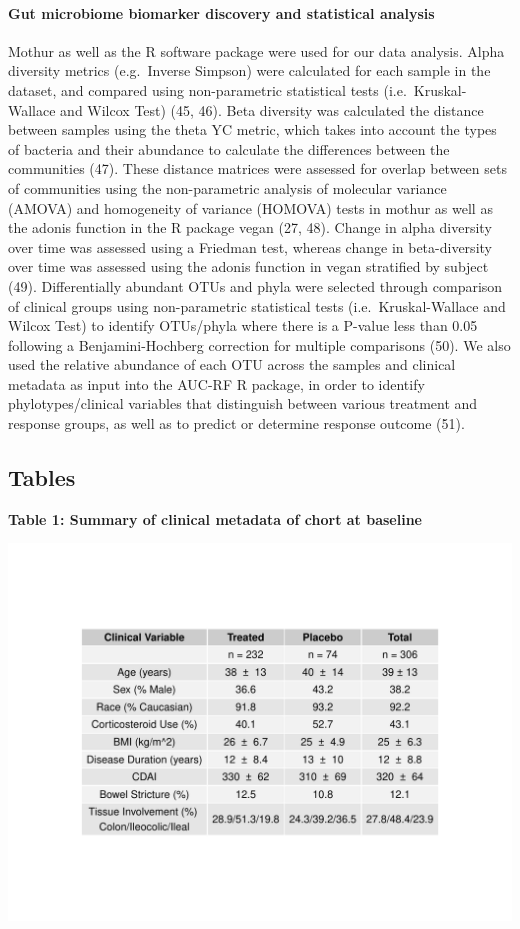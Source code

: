 \documentclass[11pt,]{article}
\let\oldparagraph\paragraph
\renewcommand{\paragraph}[1]{\oldparagraph{#1}\mbox{}}
\begin{document}
\paragraph{Gut microbiome biomarker discovery and statistical
analysis}\label{gut-microbiome-biomarker-discovery-and-statistical-analysis}

Mothur as well as the R software package were used for our data
analysis. Alpha diversity metrics (e.g.~Inverse Simpson) were calculated
for each sample in the dataset, and compared using non-parametric
statistical tests (i.e.~Kruskal-Wallace and Wilcox Test) (45, 46). Beta
diversity was calculated the distance between samples using the theta YC
metric, which takes into account the types of bacteria and their
abundance to calculate the differences between the communities (47).
These distance matrices were assessed for overlap between sets of
communities using the non-parametric analysis of molecular variance
(AMOVA) and homogeneity of variance (HOMOVA) tests in mothur as well as
the adonis function in the R package vegan (27, 48). Change in alpha
diversity over time was assessed using a Friedman test, whereas change
in beta-diversity over time was assessed using the adonis function in
vegan stratified by subject (49). Differentially abundant OTUs and phyla
were selected through comparison of clinical groups using non-parametric
statistical tests (i.e.~Kruskal-Wallace and Wilcox Test) to identify
OTUs/phyla where there is a P-value less than 0.05 following a
Benjamini-Hochberg correction for multiple comparisons (50). We also
used the relative abundance of each OTU across the samples and clinical
metadata as input into the AUC-RF R package, in order to identify
phylotypes/clinical variables that distinguish between various treatment
and response groups, as well as to predict or determine response outcome
(51).

\newpage

\subsection{Tables}\label{tables}

\textbf{Table 1: Summary of clinical metadata of chort at baseline}

\includegraphics{tables/SupTable1_baseline_metadata.pdf}
\end{document}
